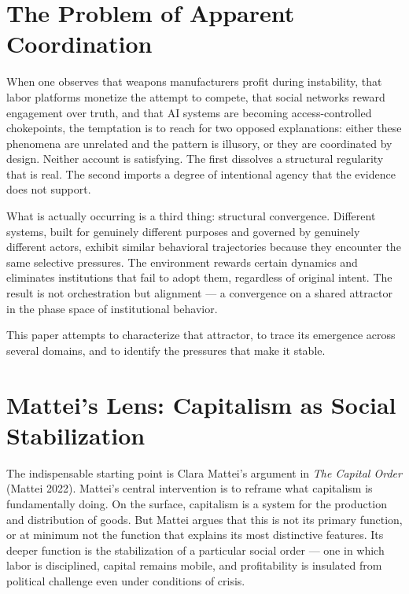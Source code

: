 \documentclass[12pt, a4paper]{article}
\begin{document}
\section{The Problem of Apparent Coordination}

When one observes that weapons manufacturers profit during instability, that
labor platforms monetize the attempt to compete, that social networks reward
engagement over truth, and that AI systems are becoming access-controlled
chokepoints, the temptation is to reach for two opposed explanations: either
these phenomena are unrelated and the pattern is illusory, or they are
coordinated by design. Neither account is satisfying. The first dissolves a
structural regularity that is real. The second imports a degree of intentional
agency that the evidence does not support.

What is actually occurring is a third thing: structural convergence. Different
systems, built for genuinely different purposes and governed by genuinely
different actors, exhibit similar behavioral trajectories because they
encounter the same selective pressures. The environment rewards certain
dynamics and eliminates institutions that fail to adopt them, regardless of
original intent. The result is not orchestration but alignment --- a
convergence on a shared attractor in the phase space of institutional
behavior.

This paper attempts to characterize that attractor, to trace its emergence
across several domains, and to identify the pressures that make it stable.

\section{Mattei's Lens: Capitalism as Social Stabilization}

The indispensable starting point is Clara Mattei's argument in \textit{The
Capital Order} (Mattei 2022). Mattei's central intervention is to
reframe what capitalism is fundamentally doing. On the surface, capitalism is
a system for the production and distribution of goods. But Mattei argues that
this is not its primary function, or at minimum not the function that explains
its most distinctive features. Its deeper function is the stabilization of a
particular social order --- one in which labor is disciplined, capital remains
mobile, and profitability is insulated from political challenge even under
conditions of crisis.
\end{document}
